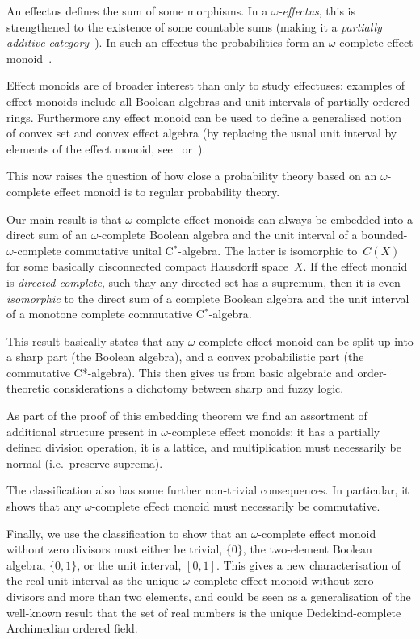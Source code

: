 \documentclass[10pt,conference]{IEEEtran}
\theoremstyle{definition}
\begin{document}
An effectus defines the sum of some morphisms. In a \emph{$\omega$-effectus}, this is strengthened to the existence of some countable sums (making it a \emph{partially additive category}~\cite{arbib1980partially}). In such an effectus the probabilities form an $\omega$-complete effect monoid~\cite{kentathesis}.

Effect monoids are of broader interest than only to study effectuses:
examples of effect monoids include all  Boolean algebras
    and unit intervals of partially ordered rings.
Furthermore any effect monoid can be used to define
    a generalised notion of convex set
    and convex effect algebra
    (by replacing the usual unit interval by elements of the effect monoid,
        see~\cite[179 \& 192]{basthesis}
        or~\cite{jacobs2011probabilities}).

This now raises the question of how close a probability theory based on an $\omega$-complete effect monoid is to regular probability theory.

Our main result is that $\omega$-complete effect monoids can always be embedded into a direct sum
of an $\omega$-complete Boolean algebra and the unit interval of a 
bounded-$\omega$-complete commutative unital C$^*$-algebra.
The latter is isomorphic to~$C(X)$ for some basically disconnected compact Hausdorff space~$X$.
If the effect monoid is \emph{directed complete}, 
such thay any directed set has a supremum, 
then it is even \emph{isomorphic}
to the direct sum of a complete Boolean algebra
and the unit interval of a monotone complete commutative C$^*$-algebra.

This result basically states that any $\omega$-complete effect monoid can be split up into a sharp part (the Boolean algebra), and a convex probabilistic part (the commutative C*-algebra). This then gives us from basic algebraic and order-theoretic considerations a dichotomy between sharp and fuzzy logic.

As part of the proof of this embedding theorem we find an assortment of additional structure present in $\omega$-complete effect monoids: it has a partially defined division operation, it is a lattice, and multiplication must necessarily be normal (i.e.~preserve suprema).

The classification also has some further non-trivial consequences. 
In particular, it shows that any $\omega$-complete effect monoid must necessarily be
    commutative.

Finally, we use the classification to show that an $\omega$-complete effect
    monoid without zero divisors must either be trivial, $\{0\}$,
    the two-element
    Boolean algebra, $\{0,1\}$, or the unit interval, $[0,1]$. 
This gives a new
    characterisation of the real unit interval as the unique 
     $\omega$-complete effect monoid without zero 
        divisors and more than two elements, and could be seen as a generalisation of the well-known result that the set of real numbers is the unique Dedekind-complete Archimedian ordered field.
\end{document}
